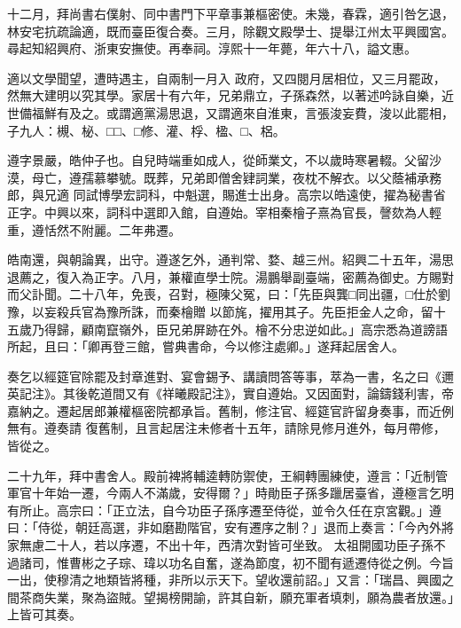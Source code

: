 \begin{pinyinscope}
 十二月，拜尚書右僕射、同中書門下平章事兼樞密使。未幾，春霖，適引咎乞退，林安宅抗疏論適，既而臺臣復合奏。三月，除觀文殿學士、提舉江州太平興國宮。尋起知紹興府、浙東安撫使。再奉祠。淳熙十一年薨，年六十八，謚文惠。



 適以文學聞望，遭時遇主，自兩制一月入
 政府，又四閱月居相位，又三月罷政，然無大建明以究其學。家居十有六年，兄弟鼎立，子孫森然，以著述吟詠自樂，近世備福鮮有及之。或謂適黨湯思退，又謂適來自淮東，言張浚妄費，浚以此罷相，子九人：槻、柲、□□、□修、灌、桴、楹、□、梠。



 遵字景嚴，皓仲子也。自兒時端重如成人，從師業文，不以歲時寒暑輟。父留沙漠，母亡，遵孺慕攀號。既葬，兄弟即僧舍肄詞業，夜枕不解衣。以父蔭補承務郎，與兄適
 同試博學宏詞科，中魁選，賜進士出身。高宗以皓遠使，擢為秘書省正字。中興以來，詞科中選即入館，自遵始。宰相秦檜子熹為官長，謦欬為人輕重，遵恬然不附麗。二年弗遷。



 皓南還，與朝論異，出守。遵遂乞外，通判常、婺、越三州。紹興二十五年，湯思退薦之，復入為正字。八月，兼權直學士院。湯鵬舉副臺端，密薦為御史。方賜對而父訃聞。二十八年，免喪，召對，極陳父冤，曰：「先臣與龔□同出疆，□仕於劉豫，以妄殺兵官為豫所誅，而秦檜贈
 以節旄，擢用其子。先臣拒金人之命，留十五歲乃得歸，顧南竄嶺外，臣兄弟屏跡在外。檜不分忠逆如此。」高宗悉為道謗語所起，且曰：「卿再登三館，嘗典書命，今以修注處卿。」遂拜起居舍人。



 奏乞以經筵官除罷及封章進對、宴會錫予、講讀問答等事，萃為一書，名之曰《邇英記注》。其後乾道間又有《祥曦殿記注》，實自遵始。又因面對，論鑄錢利害，帝嘉納之。遷起居郎兼權樞密院都承旨。舊制，修注官、經筵官許留身奏事，而近例無有。遵奏請
 復舊制，且言起居注未修者十五年，請除見修月進外，每月帶修，皆從之。



 二十九年，拜中書舍人。殿前裨將輔逵轉防禦使，王綱轉團練使，遵言：「近制管軍官十年始一遷，今兩人不滿歲，安得爾？」時勛臣子孫多躐居臺省，遵極言乞明有所止。高宗曰：「正立法，自今功臣子孫序遷至侍從，並令久任在京宮觀。」遵曰：「侍從，朝廷高選，非如磨勘階官，安有遷序之制？」退而上奏言：「今內外將家無慮二十人，若以序遷，不出十年，西清次對皆可坐致。
 太祖開國功臣子孫不過諸司，惟曹彬之子琮、瑋以功名自奮，遂為節度，初不聞有遞遷侍從之例。今旨一出，使穆清之地類皆將種，非所以示天下。望收還前詔。」又言：「瑞昌、興國之間茶商失業，聚為盜賊。望揭榜開諭，許其自新，願充軍者填刺，願為農者放還。」上皆可其奏。




\end{pinyinscope}
